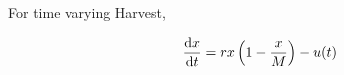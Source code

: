For time varying Harvest, 

\begin{equation}
	\frac{\mathrm{d} x}{{\mathrm{d} t}}=rx\left(1-\frac{x}{M}\right)-u(t)
\end{equation}